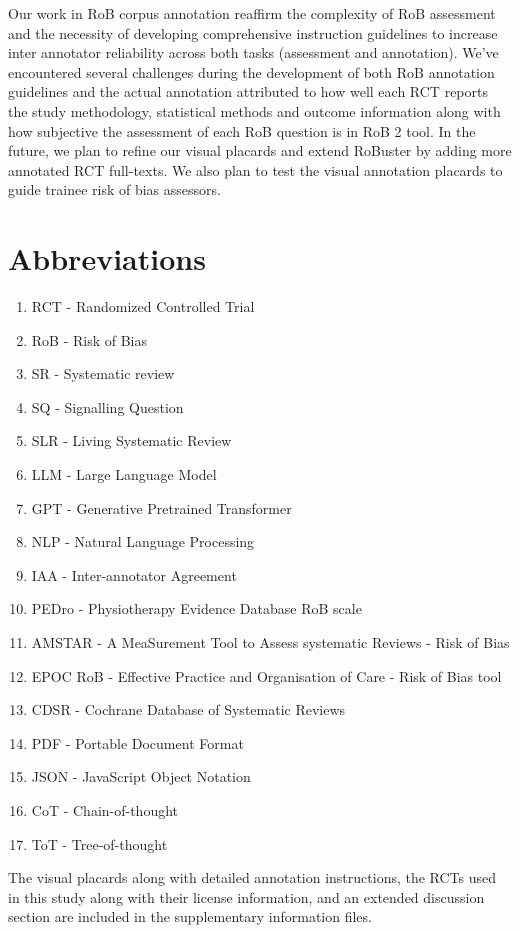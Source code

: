 \documentclass[sn-mathphys,Numbered]{sn-jnl}%
\theoremstyle{thmstyleone}%
\theoremstyle{thmstyletwo}%
\theoremstyle{thmstylethree}%
\begin{document}
Our work in RoB corpus annotation reaffirm the complexity of RoB assessment and the necessity of developing comprehensive instruction guidelines to increase inter annotator reliability across both tasks (assessment and annotation).
We've encountered several challenges during the development of both RoB annotation guidelines and the actual annotation attributed to how well each RCT reports the study methodology, statistical methods and outcome information along with how subjective the assessment of each RoB question is in RoB 2 tool.
In the future, we plan to refine our visual placards and extend RoBuster by adding more annotated RCT full-texts.
We also plan to test the visual annotation placards to guide trainee risk of bias assessors.
%
%
%
\section{Abbreviations}%
%
\begin{enumerate}
    \item RCT - Randomized Controlled Trial
    \item RoB - Risk of Bias
    \item SR - Systematic review
    \item SQ - Signalling Question
    \item SLR - Living Systematic Review
    \item LLM - Large Language Model
    \item GPT - Generative Pretrained Transformer
    \item NLP - Natural Language Processing
    \item IAA - Inter-annotator Agreement
    \item PEDro - Physiotherapy Evidence Database RoB scale
    \item AMSTAR - A MeaSurement Tool to Assess systematic Reviews - Risk of Bias
    \item EPOC RoB - Effective Practice and Organisation of Care - Risk of Bias tool
    \item CDSR - Cochrane Database of Systematic Reviews
    \item PDF - Portable Document Format
    \item JSON - JavaScript Object Notation
    \item CoT - Chain-of-thought
    \item ToT - Tree-of-thought
\end{enumerate}
%
%
%
\backmatter

%
The visual placards along with detailed annotation instructions, the RCTs used in this study along with their license information, and an extended discussion section are included in the supplementary information files.
%
%
%
\end{document}
